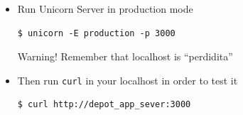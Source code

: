 \documentclass{beamer}
\begin{document}
\begin{frame}
\begin{itemize}
\item Run Unicorn Server in production mode

\lstset{language=shell}
\begin{lstlisting}[escapechar=!]
$ unicorn -E production -p 3000
\end{lstlisting}

\begin{block}{Warning!}
  Remember that localhost is ``perdidita''
\end{block}

\item Then run \texttt{curl} in your \alert{localhost} in order to test it

\begin{lstlisting}[escapechar=&]
$ curl http://depot_app_sever:3000
\end{lstlisting}

\end{itemize}



\end{frame}


\end{document}
